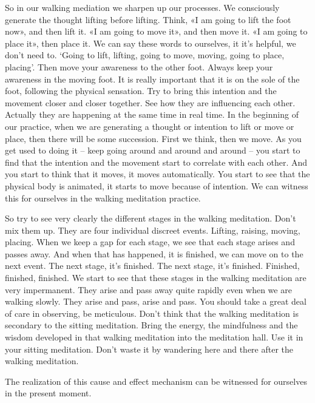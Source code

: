 \documentclass[letterpaper,10pt,english]{sphinxmanual}
\begin{document}
\sphinxAtStartPar
So  in  our  walking  mediation  we  sharpen  up  our  processes.  We  consciously  generate  the  thought  lifting  before  lifting. Think,  «I  am  going  to
lift the foot now», and then lift it. «I am going to move it», and then move
it. «I am going to place it», then place it. We can say these words to ourselves, it it’s helpful, we don’t need to. ‘Going to lift, lifting, going to move,
moving,  going  to  place,  placing’. Then  move  your  awareness  to  the  other
foot. Always keep your awareness in the moving foot. It is really important
that it is on the sole of the foot, following the physical sensation. Try to bring
this intention and the movement closer and closer together. See how they are
influencing each other. Actually they are happening at the same time in real
time. In the beginning of our practice, when we are generating a thought or
intention to lift or move or place, then there will be some succession. First
we think, then we move. As you get used to doing it – keep going around
and around and around – you start to find that the intention and the movement start to correlate with each other. And you start to think that it moves,
it moves automatically. You start to see that the physical body is animated, it
starts to move because of intention. We can witness this for ourselves in the
  walking meditation practice.

\sphinxAtStartPar
So try to see very clearly the different stages in the walking meditation.
Don’t mix them up. They are four individual discreet events. Lifting, raising, moving, placing. When we keep a gap for each stage, we see that each
stage arises and passes away. And when that has happened, it is finished, we
can move on to the next event. The next stage, it’s finished. The next stage,
it’s  finished.  Finished,  finished,  finished.  We  start  to  see  that  these  stages
in the walking meditation are very impermanent. They arise and pass away
quite rapidly even when we are walking slowly. They arise and pass, arise
and pass. You should take a great deal of care in observing, be meticulous.
Don’t think that the walking meditation is secondary to the sitting meditation.  Bring  the  energy,  the  mindfulness  and  the  wisdom  developed  in  that
walking meditation into the meditation hall. Use it in your sitting meditation.
Don’t waste it by wandering here and there after the walking meditation.

\sphinxAtStartPar
The realization of this cause and effect mechanism can be witnessed
for ourselves in the present moment.
\end{document}
